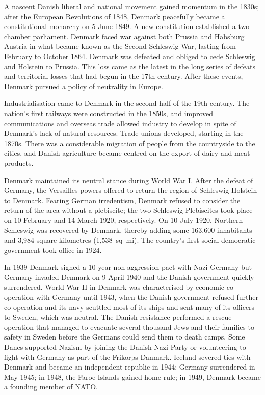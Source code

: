 A nascent Danish liberal and national movement gained momentum in the
1830s; after the European Revolutions of 1848, Denmark peacefully became
a constitutional monarchy on 5 June 1849. A new constitution established
a two-chamber parliament. Denmark faced war against both Prussia and
Habsburg Austria in what became known as the Second Schleswig War,
lasting from February to October 1864. Denmark was defeated and obliged
to cede Schleswig and Holstein to Prussia. This loss came as the latest
in the long series of defeats and territorial losses that had begun in
the 17th century. After these events, Denmark pursued a policy of
neutrality in Europe.

Industrialisation came to Denmark in the second half of the 19th
century. The nation's first railways were constructed in the 1850s, and
improved communications and overseas trade allowed industry to develop
in spite of Denmark's lack of natural resources. Trade unions developed,
starting in the 1870s. There was a considerable migration of people from
the countryside to the cities, and Danish agriculture became centred on
the export of dairy and meat products.

Denmark maintained its neutral stance during World War I. After the
defeat of Germany, the Versailles powers offered to return the region of
Schleswig-Holstein to Denmark. Fearing German irredentism, Denmark
refused to consider the return of the area without a plebiscite; the two
Schleswig Plebiscites took place on 10 February and 14 March 1920,
respectively. On 10 July 1920, Northern Schleswig was recovered by
Denmark, thereby adding some 163,600 inhabitants and 3,984 square
kilometres (1,538~sq~mi). The country's first social democratic
government took office in 1924.

In 1939 Denmark signed a 10-year non-aggression pact with Nazi Germany
but Germany invaded Denmark on 9 April 1940 and the Danish government
quickly surrendered. World War II in Denmark was characterised by
economic co-operation with Germany until 1943, when the Danish
government refused further co-operation and its navy scuttled most of
its ships and sent many of its officers to Sweden, which was neutral.
The Danish resistance performed a rescue operation that managed to
evacuate several thousand Jews and their families to safety in Sweden
before the Germans could send them to death camps. Some Danes supported
Nazism by joining the Danish Nazi Party or volunteering to fight with
Germany as part of the Frikorps Danmark. Iceland severed ties with
Denmark and became an independent republic in 1944; Germany surrendered
in May 1945; in 1948, the Faroe Islands gained home rule; in 1949,
Denmark became a founding member of NATO.

